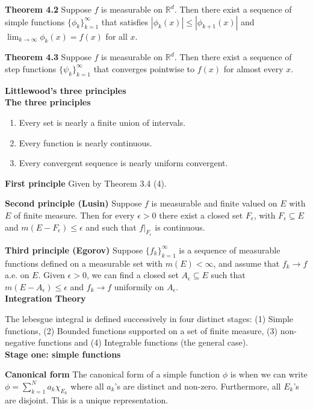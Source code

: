 \documentclass[6pt,landscape]{article}
\begin{document}
\begin{multicols*}{3}
\textbf{Theorem 4.2} Suppose $f$ is measurable on $\mathbb{R}^d$. Then there exist a sequence of simple functions $\{\phi_k\}_{k=1}^{\infty}$ that satisfies
$|\phi_k(x)|\leq |\phi_{k+1}(x)|$ and $\lim_{k\to\infty} \phi_k(x) = f(x)$ for all $x$.

\textbf{Theorem 4.3} Suppose $f$ is measurable on $\mathbb{R}^d$. Then there exist a sequence of step functions $\{\psi_k\}_{k=1}^{\infty}$ that converges pointwise to $f(x)$ for almost
every $x$.

\textbf{Littlewood's three principles}\\

\textbf{The three principles}
\begin{enumerate}
	\item Every set is nearly a finite union of intervals.
	\item Every function is nearly continuous.
	\item Every convergent sequence is nearly uniform convergent.
\end{enumerate}

\textbf{First principle} Given by Theorem 3.4 (4).

\textbf{Second principle (Lusin)} Suppose $f$ is measurable and finite valued on $E$ with $E$ of finite measure. Then for every $\epsilon>0$ there exist a closed set $F_{\epsilon}$, with
$F_{\epsilon}\subseteq E$ and $m(E-F_{\epsilon})\leq \epsilon$ and such that $f|_{F_{\epsilon}}$ is continuous.

\textbf{Third principle (Egorov)} Suppose $\{f_k\}_{k=1}^{\infty}$ is a sequence of measurable functions defined on a measurable set with $m(E)<\infty$, and assume
that $f_k\to f$ a.e. on $E$. Given $\epsilon>0$, we can find a closed set $A_{\epsilon}\subseteq E$ such that $m(E-A_{\epsilon})\leq \epsilon$ and $f_k\to f$ uniformily on $A_{\epsilon}$.\\

\textbf{Integration Theory}

The lebesgue integral is defined successively in four distinct stages: (1) Simple functions, (2) Bounded functions supported on a set of finite measure, (3) non-negative functions and
(4) Integrable functions (the general case).\\

\textbf{Stage one: simple functions}

\textbf{Canonical form} The canonical form of a simple function $\phi$ is when we can write $\phi = \sum_{k=1}^N a_k\chi_{E_k}$ where all $a_k$'s are distinct and non-zero. Furthermore,
all $E_k$'s are disjoint. This is a unique representation.


\end{multicols*}
\end{document}
